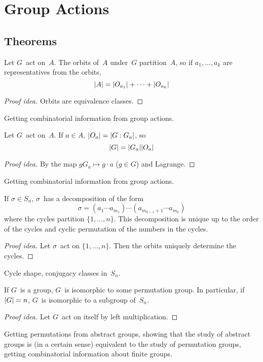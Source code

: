 %
%
%
\section{Group Actions}
\subsection*{Theorems}
\begin{thm}
Let \(G\)~act on~\(A\). The orbits of~\(A\) under~\(G\) partition~\(A\), so if \(a_1,\ldots,a_k\) are representatives from the orbits,
\[\ord{A}=\ord{O_{a_1}}+\cdots+\ord{O_{a_k}}\]
\end{thm}
\begin{proof}[Proof idea]
Orbits are equivalence classes.
\end{proof}
\begin{app}
Getting combinatorial information from group actions.
\end{app}

\begin{thm}
Let \(G\)~act on~\(A\). If \(a\in A\), \(\ord{O_a}=\idx{G_a}{G}\), so
\[\ord{G}=\ord{G_a}\ord{O_a}\]
\end{thm}
\begin{proof}[Proof idea]
By the map \(gG_a\mapsto g\cdot a\) (\(g\in G\)) and Lagrange.
\end{proof}
\begin{app}
Getting combinatorial information from group actions.
\end{app}
\begin{cor}
If \(\sigma\in S_n\), \(\sigma\)~has a decomposition of the form
\[\sigma=(a_1\cdots a_{m_1})\cdots(a_{m_{k-1}+1}\cdots a_{m_k})\]
where the cycles partition \(\{1,\ldots,n\}\). This decomposition is unique up to the order of the cycles and cyclic permutation of the numbers in the cycles.
\end{cor}
\begin{proof}[Proof idea]
Let \(\sigma\)~act on \(\{1,\ldots,n\}\). Then the orbits uniquely determine the cycles.
\end{proof}
\begin{app}
Cycle shape, conjugacy classes in~\(S_n\).
\end{app}

\begin{thm}[Cayley]
If \(G\)~is a group, \(G\)~is isomorphic to some permutation group. In particular, if \(\ord{G}=n\), \(G\)~is isomorphic to a subgroup of~\(S_n\).
\end{thm}
\begin{proof}[Proof idea]
Let \(G\)~act on itself by left multiplication.
\end{proof}
\begin{app}
Getting permutations from abstract groups, showing that the study of abstract groups is (in a certain sense) equivalent to the study of permutation groups, getting combinatorial information about finite groups.
\end{app}

